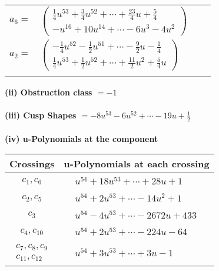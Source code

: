 \documentclass[1p]{elsarticle_modified}
\theoremstyle{definition}
\begin{document}
\begin{tabular}{m{7pt} m{180pt} m{7pt} m{180pt} }
\flushright $a_{6}=$&$\begin{pmatrix}\frac{1}{4} u^{53}+\frac{3}{4} u^{52}+\cdots+\frac{23}{4} u+\frac{5}{4}\\- u^{16}+10 u^{14}+\cdots-6 u^3-4 u^2\end{pmatrix}$ \\
\flushright $a_{2}=$&$\begin{pmatrix}-\frac{1}{4} u^{52}-\frac{1}{2} u^{51}+\cdots-\frac{9}{2} u-\frac{1}{4}\\\frac{1}{4} u^{53}+\frac{1}{2} u^{52}+\cdots+\frac{11}{2} u^2+\frac{5}{4} u\end{pmatrix}$\\&\end{tabular}
\flushleft \textbf{(ii) Obstruction class $= -1$}\\~\\
\flushleft \textbf{(iii) Cusp Shapes $= -8 u^{53}-6 u^{52}+\cdots-19 u+\frac{1}{2}$}\\~\\
\newpage\renewcommand{\arraystretch}{1}
\flushleft \textbf{(iv) u-Polynomials at the component}\newline \\
\begin{tabular}{m{50pt}|m{274pt}}
Crossings & \hspace{64pt}u-Polynomials at each crossing \\
\hline $$\begin{aligned}c_{1},c_{6}\end{aligned}$$&$\begin{aligned}
&u^{54}+18 u^{53}+\cdots+28 u+1
\end{aligned}$\\
\hline $$\begin{aligned}c_{2},c_{5}\end{aligned}$$&$\begin{aligned}
&u^{54}+2 u^{53}+\cdots-14 u^2+1
\end{aligned}$\\
\hline $$\begin{aligned}c_{3}\end{aligned}$$&$\begin{aligned}
&u^{54}-4 u^{53}+\cdots-2672 u+433
\end{aligned}$\\
\hline $$\begin{aligned}c_{4},c_{10}\end{aligned}$$&$\begin{aligned}
&u^{54}+2 u^{53}+\cdots-224 u-64
\end{aligned}$\\
\hline $$\begin{aligned}c_{7},c_{8},c_{9}\\c_{11},c_{12}\end{aligned}$$&$\begin{aligned}
&u^{54}+3 u^{53}+\cdots+3 u-1
\end{aligned}$\\
\hline
\end{tabular}\\~\\
\end{document}
